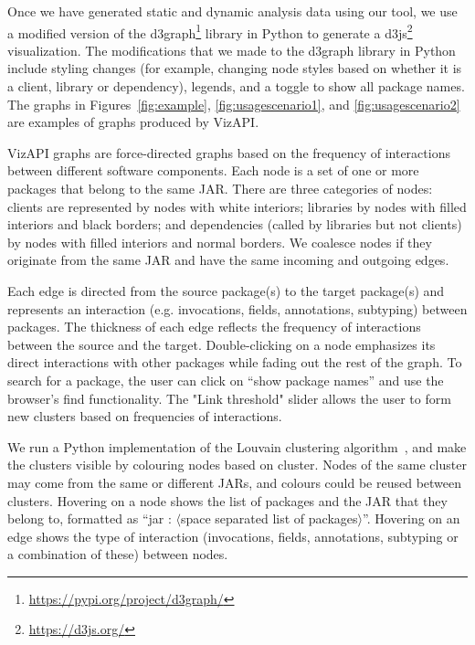 Once we have generated static and dynamic analysis data using our tool, we use a modified version
of the d3graph\footnote{\url{https://pypi.org/project/d3graph/}} library in Python to generate a d3js\footnote{\url{https://d3js.org/}}
visualization. The modifications that we made to the d3graph  library in Python include styling changes (for example, changing node styles based on whether it is a client, library or dependency),
legends, and a toggle to show all package names. 
The graphs in Figures~\ref{fig:example}, \ref{fig:usagescenario1}, and \ref{fig:usagescenario2} are examples of graphs produced by VizAPI.

VizAPI graphs are force-directed graphs based on the frequency of
interactions between different software components.  Each node is a
set of one or more packages that belong to the same JAR.  There are
three categories of nodes: clients are represented by nodes with white
interiors; libraries by nodes with filled interiors and black borders;
and dependencies (called by libraries but not clients) by nodes with
filled interiors and normal borders.  We coalesce nodes if they
originate from the same JAR and have the same incoming and
outgoing edges.

Each edge is directed
from the source package(s) to the target package(s) and represents an interaction 
(e.g. invocations, fields, annotations, subtyping) between packages. 
The thickness of each edge reflects the frequency of interactions between the source and the target.
Double-clicking on a node emphasizes its direct interactions with other packages while fading out the rest of the graph.
To search for a package, the user can click on “show package
names” and use the browser’s find functionality. 
The "Link threshold" slider allows the user to form new clusters based on frequencies of interactions.


We run a Python implementation of the Louvain clustering algorithm~\cite{blondel2008fast}, and make the clusters 
visible by colouring nodes based on cluster.
Nodes of the same cluster may come from the same or different JARs, and colours could be reused between clusters.
Hovering on a node shows the list of packages and 
the JAR that they belong to, 
formatted as “jar : $\langle$space separated list of packages$\rangle$”. 
Hovering on an edge shows the type of interaction (invocations, fields, annotations, subtyping or a combination of these) between nodes.
